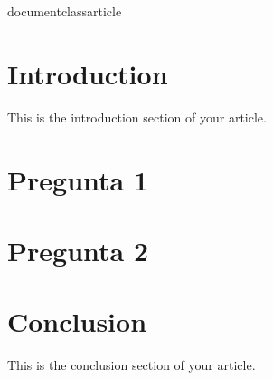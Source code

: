 documentclass{article}



\section{Introduction}
This is the introduction section of your article.

\section{Pregunta 1}

\section{Pregunta 2}

\section{Conclusion}
This is the conclusion section of your article.

